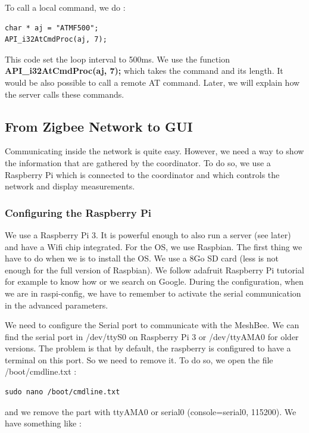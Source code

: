 To call a local command, we do :

\begin{lstlisting}[frame=single]
char * aj = "ATMF500";
API_i32AtCmdProc(aj, 7);
\end{lstlisting}

This code set the loop interval to 500ms. We use the function\textbf{ API\_i32AtCmdProc(aj, 7);} which takes the command and its length. It would be also possible to call a remote AT command. Later, we will explain how the server calls these commands.

\subsection{From Zigbee Network to GUI}

Communicating inside the network is quite easy. However, we need a way to show the information that are gathered by the coordinator. To do so, we use a Raspberry Pi which is connected to the coordinator and which controls the network and display measurements.

\subsubsection{Configuring the Raspberry Pi}

We use a Raspberry Pi 3. It is powerful enough to also run a server (see later) and have a Wifi chip integrated. For the OS, we use Raspbian. The first thing we have to do when we is to install the OS. We use a 8Go SD card (less is not enough for the full version of Raspbian). We follow adafruit Raspberry Pi tutorial for example to know how or we search on Google. During the configuration, when we are in raspi-config, we have to remember to activate the serial communication in the advanced parameters.

We need to configure the Serial port to communicate with the MeshBee. We can find the serial port in /dev/ttyS0 on Raspberry Pi 3 or /dev/ttyAMA0 for older versions. The problem is that by default, the raspberry is configured to have a terminal on this port. So we need to remove it. To do so, we open the file /boot/cmdline.txt :

\begin{lstlisting}[frame=single]
sudo nano /boot/cmdline.txt
\end{lstlisting}

and we remove the part with ttyAMA0 or serial0 (console=serial0, 115200). We have something like :

